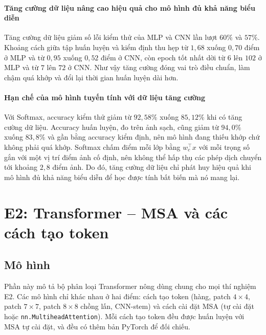 \documentclass[a4paper,12pt]{article}
\begin{document}
\paragraph{Tăng cường dữ liệu nâng cao hiệu quả cho mô hình đủ khả năng biểu diễn} Tăng cường dữ liệu giảm số lỗi kiểm thử của MLP và CNN lần lượt $60\%$ và $57\%$. Khoảng cách giữa tập huấn luyện và kiểm định thu hẹp từ $1{,}68$ xuống $0{,}70$ điểm ở MLP và từ $0{,}95$ xuống $0{,}52$ điểm ở CNN, còn epoch tốt nhất dời từ $6$ lên $102$ ở MLP và từ $7$ lên $72$ ở CNN. Như vậy tăng cường đóng vai trò điều chuẩn, làm chậm quá khớp và đổi lại thời gian huấn luyện dài hơn.

\paragraph{Hạn chế của mô hình tuyến tính với dữ liệu tăng cường} Với Softmax, accuracy kiểm thử giảm từ $92{,}58\%$ xuống $85{,}12\%$ khi có tăng cường dữ liệu. Accuracy huấn luyện, đo trên ảnh sạch, cũng giảm từ $94{,}0\%$ xuống $83{,}8\%$ và gần bằng accuracy kiểm định, nên mô hình đang thiếu khớp chứ không phải quá khớp. Softmax chấm điểm mỗi lớp bằng $w_c^\top x$ với mỗi trọng số gắn với một vị trí điểm ảnh cố định, nên không thể hấp thụ các phép dịch chuyển tới khoảng $2{,}8$ điểm ảnh. Do đó, tăng cường dữ liệu chỉ phát huy hiệu quả khi mô hình đủ khả năng biểu diễn để học được tính bất biến mà nó mang lại.

\section{E2: Transformer -- MSA và các cách tạo token}
\label{sec:e2}

\subsection{Mô hình}
\label{sec:e2-models}

Phần này mô tả bộ phân loại Transformer nông dùng chung cho mọi thí nghiệm E2. Các mô hình chỉ khác nhau ở hai điểm: cách tạo token (hàng, patch $4\times4$, patch $7\times7$, patch $8\times8$ chồng lấn, CNN-stem) và cách cài đặt MSA (tự cài đặt hoặc \texttt{nn.MultiheadAttention}). Mỗi cách tạo token đều được huấn luyện với MSA tự cài đặt, và đều có thêm bản PyTorch để đối chiếu.
\end{document}
